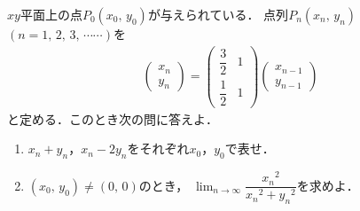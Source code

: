 \documentclass[../../main.tex]{subfiles}
\begin{document}
$xy$平面上の点$P_0(x_0, \, y_0)$が与えられている．
点列$P_n(x_n, \, y_n)$ $(n=1, \,2, \, 3, \, \cdots\cdots)$を
\begin{align}
  \begin{pmatrix} x_n \\ y_n
  \end{pmatrix}=
  \begin{pmatrix} \displaystyle\dfrac{3}{2} & 1 \\ \displaystyle\dfrac{1}{2} & 1
  \end{pmatrix}
  \begin{pmatrix} x_{n-1} \\ y_{n-1}
  \end{pmatrix}
\end{align}
と定める．このとき次の問に答えよ．
\begin{enumerate}
  \item $x_n+y_n$，$x_n-2y_n$をそれぞれ$x_0$，$y_0$で表せ．
  \item $(x_0, \, y_0)\neq(0, \, 0)$のとき，
    $\displaystyle\lim_{n\to\infty}\dfrac{{x_n}^2}{{x_n}^2+{y_n}^2}$を求めよ．
\end{enumerate}
\end{document}
